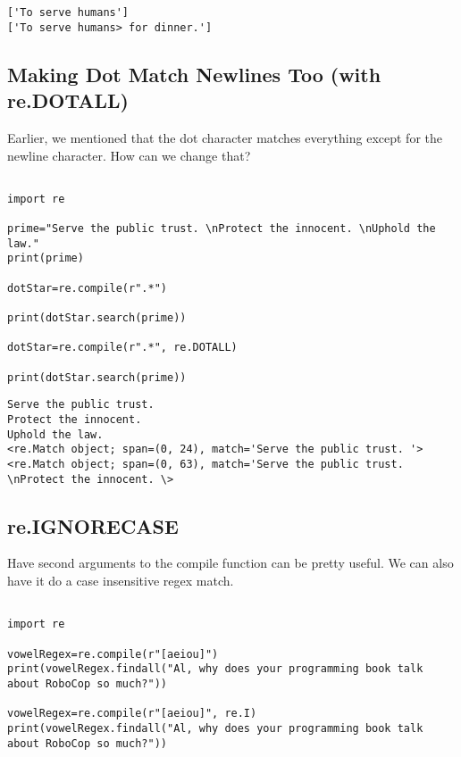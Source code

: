\documentclass[11pt]{article}
\begin{document}
\begin{verbatim}
['To serve humans']
['To serve humans> for dinner.']
\end{verbatim}

\subsection{Making Dot Match Newlines Too (with re.DOTALL)}
\label{sec:orgecf8c08}

Earlier, we mentioned that the dot character matches everything except for the newline character. How can we change that?

\begin{verbatim}

import re

prime="Serve the public trust. \nProtect the innocent. \nUphold the law."
print(prime)

dotStar=re.compile(r".*")

print(dotStar.search(prime))

dotStar=re.compile(r".*", re.DOTALL)

print(dotStar.search(prime))

\end{verbatim}

\begin{verbatim}
Serve the public trust. 
Protect the innocent. 
Uphold the law.
<re.Match object; span=(0, 24), match='Serve the public trust. '>
<re.Match object; span=(0, 63), match='Serve the public trust. \nProtect the innocent. \>
\end{verbatim}

\subsection{re.IGNORECASE}
\label{sec:org5313bb0}

Have second arguments to the compile function can be pretty useful. We can also have it do a case insensitive regex match.

\begin{verbatim}

import re

vowelRegex=re.compile(r"[aeiou]")
print(vowelRegex.findall("Al, why does your programming book talk about RoboCop so much?"))

vowelRegex=re.compile(r"[aeiou]", re.I)
print(vowelRegex.findall("Al, why does your programming book talk about RoboCop so much?"))


\end{verbatim}
\end{document}
